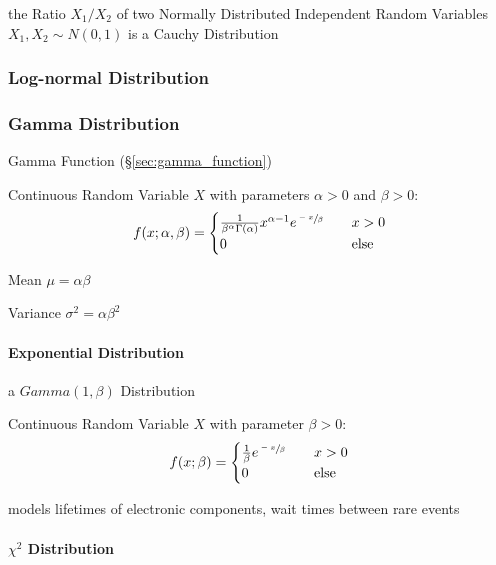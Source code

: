 the Ratio $X_1/X_2$ of two Normally Distributed Independent Random Variables
$X_1, X_2 \sim N(0,1)$ is a Cauchy Distribution



\subsubsection{Log-normal Distribution}\label{sec:lognormal_distribution}

\subsubsection{Gamma Distribution}\label{sec:gamma_distribution}

Gamma Function (\S\ref{sec:gamma_function})

Continuous Random Variable $X$ with parameters $\alpha > 0$ and $\beta
> 0$:
\[
  f(x; \alpha, \beta) =
  \begin{cases}
  \frac{1}{\beta^\alpha \Gamma(\alpha)} x^{\alpha-1} e^{\sfrac{-x}{\beta}}
        & \quad x > 0 \\
  0     & \quad\text{else} \\
  \end{cases}
\]

Mean $\mu = \alpha \beta$

Variance $\sigma^2 = \alpha \beta^2$



\paragraph{Exponential Distribution}\label{sec:exponential_squared}\hfill

a $Gamma(1,\beta)$ Distribution

Continuous Random Variable $X$ with parameter $\beta > 0$:
\[
  f(x; \beta) =
  \begin{cases}
  \frac{1}{\beta} e^{\sfrac{-x}{\beta}}     & \quad x > 0 \\
  0     & \quad\text{else} \\
  \end{cases}
\]

models lifetimes of electronic components, wait times between rare events



\paragraph{$\chi^2$ Distribution}\label{sec:chi_squared}\hfill

